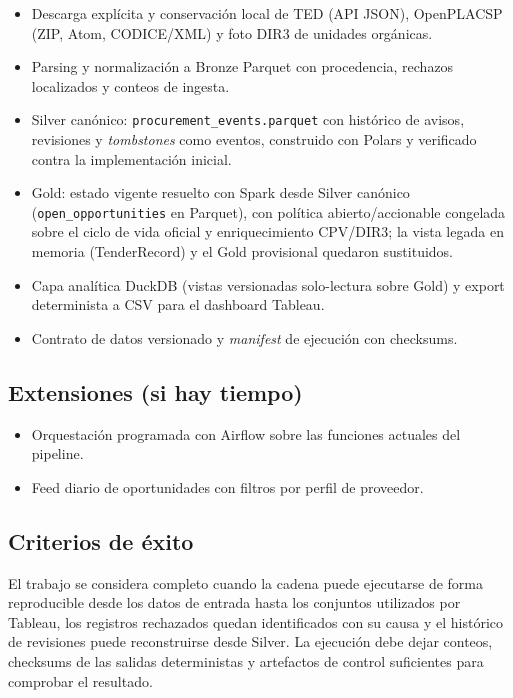 \documentclass[11pt,a4paper]{article}
\begin{document}
\begin{itemize}
  \item Descarga explícita y conservación local de TED (API JSON), OpenPLACSP
        (ZIP, Atom, CODICE/XML) y foto DIR3 de unidades orgánicas.
  \item Parsing y normalización a Bronze Parquet con procedencia, rechazos
        localizados y conteos de ingesta.
  \item Silver canónico: \texttt{procurement\_events.parquet} con histórico de
        avisos, revisiones y \emph{tombstones} como eventos, construido con
        Polars y verificado contra la implementación inicial.
  \item Gold: estado vigente resuelto con Spark desde Silver canónico
        (\texttt{open\_opportunities} en Parquet), con política
        abierto/accionable congelada sobre el ciclo de vida oficial y
        enriquecimiento CPV/DIR3; la vista legada en memoria (TenderRecord) y el
        Gold provisional quedaron sustituidos.
  \item Capa analítica DuckDB (vistas versionadas solo-lectura sobre Gold) y
        export determinista a CSV para el dashboard Tableau.
  \item Contrato de datos versionado y \emph{manifest} de ejecución con checksums.
\end{itemize}

\subsection{Extensiones (si hay tiempo)}

\begin{itemize}
  \item Orquestación programada con Airflow sobre las funciones actuales del
        pipeline.
  \item Feed diario de oportunidades con filtros por perfil de proveedor.
\end{itemize}

\subsection{Criterios de éxito}

El trabajo se considera completo cuando la cadena puede ejecutarse de forma
reproducible desde los datos de entrada hasta los conjuntos utilizados por
Tableau, los registros rechazados quedan identificados con su causa y el
histórico de revisiones puede reconstruirse desde Silver. La ejecución debe
dejar conteos, checksums de las salidas deterministas y artefactos de control
suficientes para comprobar el resultado.
\end{document}
